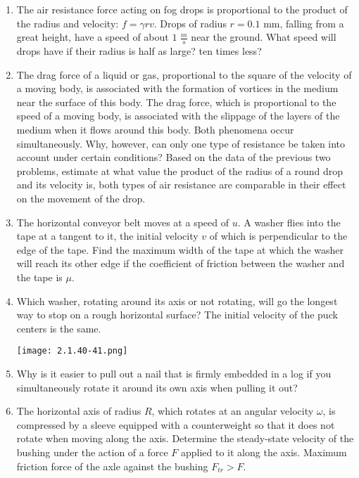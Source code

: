 \documentclass{article}
\begin{document}
\begin{enumerate}[label=2.1.\arabic*]
\item The air resistance force acting on fog drops is proportional to the product of the radius and velocity: $f = \gamma rv$. Drops of radius $r = 0.1$ mm, falling from a great height, have a speed of about $1$ $\frac{m}{s}$ near the ground. What speed will drops have if their radius is half as large? ten times less?

\item The drag force of a liquid or gas, proportional to the square of the velocity of a moving body, is associated with the formation of vortices in the medium near the surface of this body. The drag force, which is proportional to the speed of a moving body, is associated with the slippage of the layers of the medium when it flows around this body. Both phenomena occur simultaneously. Why, however, can only one type of resistance be taken into account under certain conditions? Based on the data of the previous two problems, estimate at what value the product of the radius of a round drop and its velocity is, both types of air resistance are comparable in their effect on the movement of the drop.

\item The horizontal conveyor belt moves at a speed of $u$. A washer flies into the tape at a tangent to it, the initial velocity $v$ of which is perpendicular to the edge of the tape. Find the maximum width of the tape at which the washer will reach its other edge if the coefficient of friction between the washer and the tape is $\mu$.

\item Which washer, rotating around its axis or not rotating, will go the longest way to stop on a rough horizontal surface? The initial velocity of the puck centers is the same.

\begin{center}
    \texttt{[image: 2.1.40-41.png]}
\end{center}

\item Why is it easier to pull out a nail that is firmly embedded in a log if you simultaneously rotate it around its own axis when pulling it out?

\item The horizontal axis of radius $R$, which rotates at an angular velocity $\omega$, is compressed by a sleeve equipped with a counterweight so that it does not rotate when moving along the axis. Determine the steady-state velocity of the bushing under the action of a force $F$ applied to it along the axis. Maximum friction force of the axle against the bushing $F_{tr} > F$.


\end{enumerate}
\end{document}
